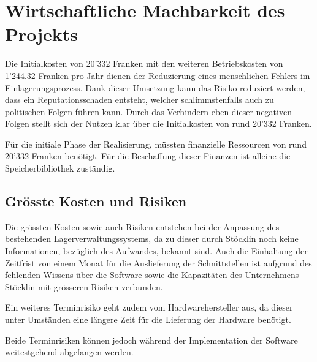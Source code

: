 \chapter{Wirtschaftliche Machbarkeit des Projekts}
Die Initialkosten von 20'332 Franken mit den weiteren Betriebskosten von 1'244.32 Franken pro Jahr dienen der Reduzierung eines menschlichen Fehlers im Einlagerungsprozess. Dank dieser Umsetzung kann das Risiko reduziert werden, dass ein Reputationsschaden entsteht, welcher schlimmstenfalls auch zu politischen Folgen führen kann.
Durch das Verhindern eben dieser negativen Folgen stellt sich der Nutzen klar über die Initialkosten von rund 20'332 Franken.

Für die initiale Phase der Realisierung, müssten finanzielle Ressourcen von rund 20'332 Franken benötigt. Für die Beschaffung dieser Finanzen ist alleine die Speicherbibliothek zuständig.

\section{Grösste Kosten und Risiken}
Die grössten Kosten sowie auch Risiken entstehen bei der Anpassung des bestehenden Lagerverwaltungssystems, da zu dieser durch Stöcklin noch keine Informationen, bezüglich des Aufwandes, bekannt sind. Auch die Einhaltung der Zeitfrist von einem Monat für die Auslieferung der Schnittstellen ist aufgrund des fehlenden Wissens über die Software sowie die Kapazitäten des Unternehmens Stöcklin mit grösseren Risiken verbunden.

Ein weiteres Terminrisiko geht zudem vom Hardwarehersteller aus, da dieser unter Umständen eine längere Zeit für die Lieferung der Hardware benötigt.

Beide Terminrisiken können jedoch während der Implementation der Software weitestgehend abgefangen werden.
